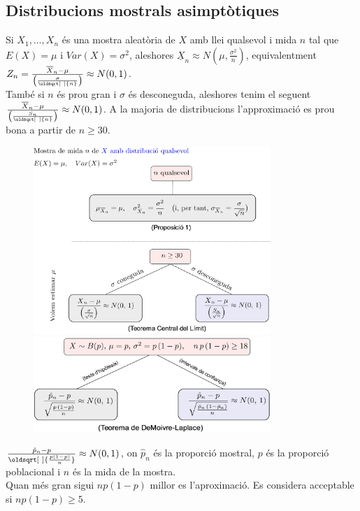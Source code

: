 \documentclass[a4paper]{sciposter}
\renewcommand*{\sqrt}[2][\ ]{\oldsqrt[#1]{#2} }
\begin{document}
\begin{multicols}{3}
\subsection{Distribucions mostrals asimptòtiques}
Si $X_1,\dots,X_n$ és una mostra aleatòria de $X$ amb llei qualsevol i mida $n$ tal que $E(X) = \mu$ i $Var(X) = \sigma^2$, aleshores $\underline{X}_n \approx N\left(\mu, \frac{\sigma^2}{n}\right)$, equivalentment $Z_n = \frac{\overline{X}_n - \mu}{\left(\frac{\sigma}{\sqrt{n}}\right)} \approx N(0,1)$.\\
També si $n$ és prou gran i $\sigma$ és desconeguda, aleshores tenim el seguent $\frac{\overline{X}_n - \mu}{\left(\frac{S_n}{\sqrt{n}}\right)} \approx N(0,1)$. A la majoria de distribucions l'approximació es prou bona a partir de $n \geq 30$.\\
\begin{figure}[H]
	\centering
	\includegraphics[width=0.8\textwidth]{distro.png}
	\includegraphics[width=0.8\textwidth]{distro2.png}
\end{figure}
$\frac{\hat{p}_n-p}{\sqrt{\frac{p(1-p)}{n}}} \approx N(0,1)$, on $\hat{p}_n$ és la proporció mostral, $p$ és la proporció poblacional i $n$ és la mida de la mostra.\\
Quan més gran sigui $np(1-p)$ millor es l'aproximació. Es considera acceptable si $np(1-p) \geq 5$.

\end{multicols}
\end{document}
